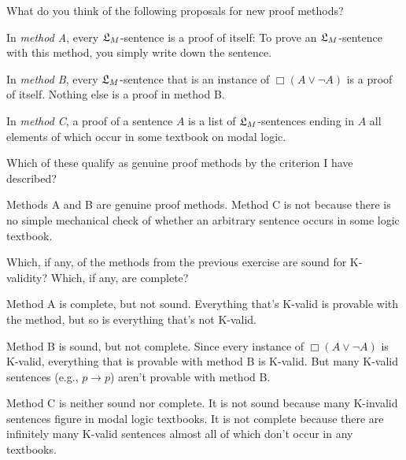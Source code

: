 \begin{exercise}\label{ex:proofmethods}
  What do you think of the following proposals for new proof methods?
  \begin{exlist}
    \item In \emph{method A}, every $\mathfrak{L}_{M}$-sentence is a proof of itself: To
    prove an $\mathfrak{L}_{M}$-sentence with this method, you simply write down the
    sentence.
    \item In \emph{method B}, every $\mathfrak{L}_{M}$-sentence that is an instance of
    $\Box(A \lor \neg A)$ is a proof of itself. Nothing else is a proof in
    method B.
    \item In \emph{method C}, a proof of a sentence $A$ is a list of
    $\mathfrak{L}_{M}$-sentences ending in $A$ all elements of which occur in some
    textbook on modal logic.
  \end{exlist}
  Which of these qualify as genuine proof methods by the criterion I have
  described?
\end{exercise}
\begin{solution}
  Methods A and B are genuine proof methods. Method C is not because there is no
  simple mechanical check of whether an arbitrary sentence occurs in some logic
  textbook.
\end{solution}

\begin{exercise}\label{ex:sillyproofmethod}
  Which, if any, of the methods from the previous exercise are sound for
  K-validity? Which, if any, are complete?
\end{exercise}
\begin{solution}
  Method A is complete, but not sound. Everything that's K-valid is provable
  with the method, but so is everything that's not K-valid.
  
  Method B is sound, but not complete. Since every instance of
  $\Box (A \lor \neg A)$ is K-valid, everything that is provable with method B
  is K-valid. But many K-valid sentences (e.g., $p \to p$) aren't provable with
  method B.

  Method C is neither sound nor complete. It is not sound because many K-invalid
  sentences figure in modal logic textbooks. It is not complete because there
  are infinitely many K-valid sentences almost all of which don't occur in any
  textbooks.
\end{solution}


